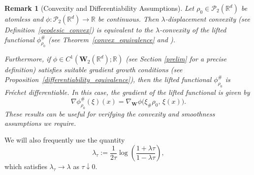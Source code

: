 \documentclass[11pt,a4paper]{amsart}
\newcommand{\1}{\mathds{1}}
\newtheorem{remark}[theorem]{\textbf{Remark}}
\numberwithin{equation}{section}
\begin{document}
\begin{remark}[Convexity and Differentiability Assumptions] 
\label{sufficient_conditions_rough_assumptions}
Let $\rho_0 \in \mathcal{P}_{2}(\mathbb{R}^d)$ be atomless and $\phi : \mathcal{P}_2(\mathbb{R}^d) \to \mathbb{R}$ be continuous. Then $\lambda$-displacement convexity (see Definition~\ref{geodesic_convex}) is equivalent to the $\lambda$-convexity of the lifted functional $\phi^{\#}_{\rho_0}$ (see Theorem~\ref{convex_equivalence} and \cite{gangbo2022global}).
\smallskip

\noindent
Furthermore, if $\phi \in C^1(\mathbf{W}_2(\mathbb{R}^d); \mathbb{R})$ (see Section \ref{prelim} for a precise definition) satisfies suitable gradient growth conditions (see Proposition~\ref{differentiability_equivalence}), then the lifted functional $\phi^{\#}_{\rho_0}$ is Fréchet differentiable. In this case, the gradient of the lifted functional is given by
\[
\nabla \phi^{\#}_{\rho_0}(\xi)(x) = \nabla_{\mathbf{W}} \phi\big(\xi_{\#} \rho_0,\, \xi(x)\big).
\]
These results can be useful for verifying the convexity and smoothness assumptions we require.
\end{remark}



We will also frequently use the quantity
\begin{equation} \label{lambda_tau_def}
    \lambda_{\tau} := \frac{1}{2\tau} \log\!\left( \frac{1 + \lambda \tau}{1 - \lambda \tau} \right),
\end{equation}
which satisfies $\lambda_{\tau} \to \lambda$ as $\tau \downarrow 0$.
\end{document}
